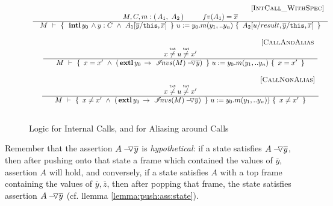 \small{
\begin{figure}[hbt]
$\begin{array}{c}
\inferruleSD{\hspace{4.7cm} [\sc{IntCall\_WithSpec}]}
	{ 
	   	M, C, m  :  (\, A_1, \ A_2\, )\ \ \  \ \ \ \ \ fv(A_1)=\overline x
          		}
	{   \hproves{M} 
						{ \ {\internal{y_0}}  \wedge  y:C  \ \wedge \ A_1[\overline y/\prg{this},\overline x] \  }
						{ \ u:=y_0.m(y_1,.. y_n)\    }
						{ \  A_2[ u/result,\overline y/\prg{this},\overline x]  \ }	
}
\\
\\
\inferruleSD{\hspace{4.7cm}  [{\sc{CallAndAlias}}}
	{ 
	{   x \txtneq u\txtneq x'  }
	}
	{   \hproves{M}  { \ x=x'\   \wedge \ ({\external{y_0}}  \rightarrow \  \PushAS {y}{\extract{M}})\  }	{ \ u:=y_0.m(y_1,.. y_n)\  } { \  x=x'\ }	 }

\\ \\ 
\inferruleSD{\hspace{4.7cm} [{\sc{CallNonAlias}}]}	
{ 
		{ \ x \txtneq u \txtneq x'\   }
	}
	{   \hproves{M}   { \ x\neq x'\   \wedge \ ({\external{y_0}}  \rightarrow \  \PushAS {y}{\extract{M}})\  } { \ u:=y_0.m(y_1,.. y_n))\  } { \  x\neq x'\ }	 }
\\
\\
\end{array}
$
\caption{Logic for Internal Calls, and  for Aliasing around Calls }
\label{f:internal:alias:calls}
\end{figure}
}




Remember that the assertion $\PushAS y A$ is \emph{hypothetical}: if a state satisfies $\PushAS y A$, then after pushing
onto that state a frame which contained the values  of $\overline y$, assertion $A$ will hold, and conversely,   if a state satisfies  $A$ with a top frame containing the  values of $\overline y, \overline z$, then  after popping that frame, the state  satisfies assertion  $\PushAS y A$ (cf. llemma \ref{lemma:push:ass:state}).
 
